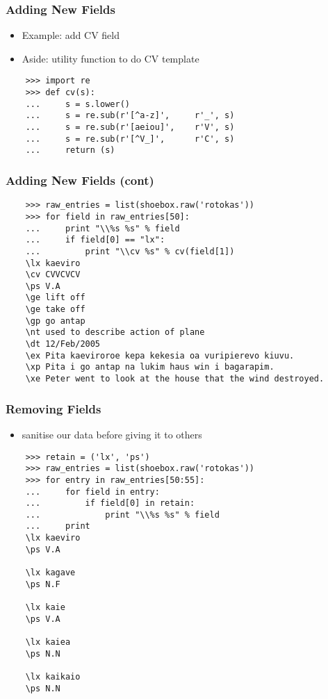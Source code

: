 \documentclass{beamer}
\begin{document}
\begin{frame}[fragile]
\frametitle{Adding New Fields}

\begin{itemize}
\item Example: add CV field
\item Aside: utility function to do CV template
\end{itemize}

\begin{verbatim}
    >>> import re
    >>> def cv(s):
    ...     s = s.lower()
    ...     s = re.sub(r'[^a-z]',     r'_', s)
    ...     s = re.sub(r'[aeiou]',    r'V', s)
    ...     s = re.sub(r'[^V_]',      r'C', s)
    ...     return (s)
\end{verbatim}
\end{frame}

\begin{frame}[fragile]
\frametitle{Adding New Fields (cont)}

\begin{verbatim}
    >>> raw_entries = list(shoebox.raw('rotokas'))
    >>> for field in raw_entries[50]:
    ...     print "\\%s %s" % field
    ...	    if field[0] == "lx":
    ...	        print "\\cv %s" % cv(field[1])
    \lx kaeviro
    \cv CVVCVCV
    \ps V.A
    \ge lift off
    \ge take off
    \gp go antap
    \nt used to describe action of plane
    \dt 12/Feb/2005
    \ex Pita kaeviroroe kepa kekesia oa vuripierevo kiuvu.
    \xp Pita i go antap na lukim haus win i bagarapim.
    \xe Peter went to look at the house that the wind destroyed.
\end{verbatim}
\end{frame}

\begin{frame}[fragile]
\frametitle{Removing Fields}
\scriptsize

\begin{itemize}
\item sanitise our data before giving it to others
\end{itemize}

\begin{verbatim}
    >>> retain = ('lx', 'ps')
    >>> raw_entries = list(shoebox.raw('rotokas'))
    >>> for entry in raw_entries[50:55]:
    ...     for field in entry:
    ...         if field[0] in retain:
    ...             print "\\%s %s" % field
    ...     print
    \lx kaeviro
    \ps V.A

    \lx kagave
    \ps N.F

    \lx kaie
    \ps V.A

    \lx kaiea
    \ps N.N

    \lx kaikaio
    \ps N.N
\end{verbatim}
\end{frame}
\end{document}
